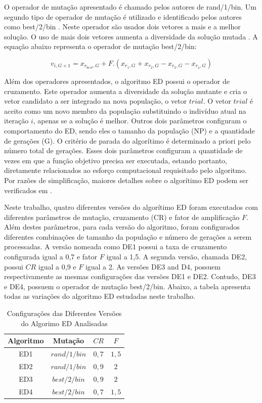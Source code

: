 \documentclass[12pt,A4,A4pt]{article}
\begin{document}
O operador de mutação apresentado é chamado pelos autores de rand/1/bin. Um segundo tipo de operador de mutação é utilizado e identificado pelos autores como best/2/bin \cite{Storn1997}. Neste operador são usados dois vetores a mais e a melhor solução. O uso de mais dois vetores aumenta a diversidade da solução mutada \cite{Storn1997}. A equação abaixo representa o operador de mutação best/2/bin:

\begin{equation}
v_{i,G+1} = x_{r_{best},G} + F . (x_{r_{1},G} + x_{r_{2},G} - x_{r_{3},G} - x_{r_{4},G}) \label{trial2}
\end{equation}


Além dos operadores apresentados, o algoritmo ED possui o operador de cruzamento. Este operador aumenta a diversidade da solução mutante e cria o vetor candidato a ser integrado na nova população, o vetor $trial$. O vetor $trial$ é aceito como um novo membro da população substituindo o indivíduo atual na iteração $i$, apenas se a solução é melhor. Outros dois parâmetros configuram o comportamento do ED, sendo eles o tamanho da população (NP) e a quantidade de gerações (G). O critério de parada do algorítimo é determinado a priori pelo número total de gerações. Esses dois parâmetros configuram a quantidade de vezes em que a função objetivo precisa ser executada,  estando portanto, diretamente relacionados ao esforço computacional requisitado pelo algoritmo. Por razões de simplificação, maiores detalhes sobre o algorítimo ED podem ser verificados em \cite{Storn1997}.

Neste trabalho, quatro diferentes versões do algorítimo ED foram executados com diferentes parâmetros de mutação, cruzamento (CR) e fator de amplificação $F$. Além destes parâmetros, para cada versão do algoritmo, foram configurados diferentes combinações de tamanho da população e número de gerações  a serem processadas. A versão nomeada como DE1 possui a taxa de cruzamento  configurada igual a 0,7 e fator $F$ igual a 1,5. A segunda versão, chamada DE2, possui $CR$ igual a 0,9 e $F$ igual a 2. As versões DE3 and D4, possuem respectivamente as mesmas configurações das versões DE1 e DE2. Contudo, DE3 e DE4, possuem o operador de mutação best/2/bin. Abaixo, a tabela apresenta todas as variações do algoritmo ED estudadas neste trabalho.

\begin{table}[htbp]
\small
\centering
\caption{\small Configurações das Diferentes Versões do Algorimo ED Analisadas}
\begin{tabular}{cccc}
\hline
Algoritmo & Mutação & $CR$ & $F$ \\
\hline
ED1 & $rand/1/bin$ & $0,7$ & $1,5$  \\
ED2 & $rand/1/bin$ & $0,9$ & $2$  \\
ED3 & $best/2/bin$ & $0,9$ & $2$  \\
ED4 & $best/2/bin$ & $0,7$ & $1,5$  \\
\hline
\end{tabular}
  \label{tab:algos}
\end{table}
\end{document}
